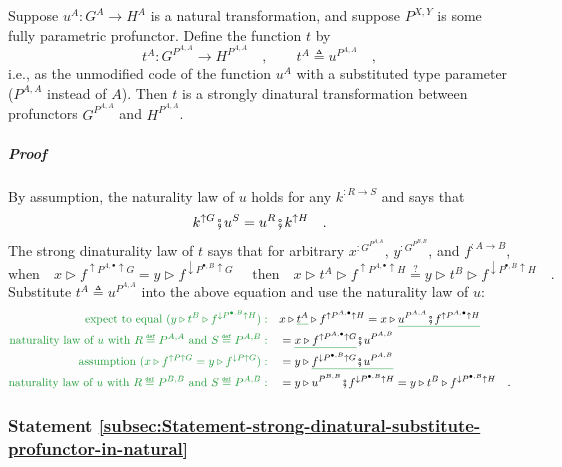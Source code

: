 Suppose $u^{A}:G^{A}\rightarrow H^{A}$ is a natural transformation,
and suppose $P^{X,Y}$ is some fully parametric profunctor. Define
the function $t$ by
\[
t^{A}:G^{P^{A,A}}\rightarrow H^{P^{A,A}}\quad,\quad\quad t^{A}\triangleq u^{P^{A,A}}\quad,
\]
i.e., as the unmodified code of the function $u^{A}$ with a substituted
type parameter ($P^{A,A}$ instead of $A$). Then $t$ is a strongly
dinatural transformation between profunctors $G^{P^{A,A}}$ and $H^{P^{A,A}}$.

\subparagraph{Proof}

By assumption, the naturality law of $u$ holds for any $k^{:R\rightarrow S}$
and says that
\[
k^{\uparrow G}\bef u^{S}=u^{R}\bef k^{\uparrow H}\quad.
\]
The strong dinaturality law of $t$ says that for arbitrary $x^{:G^{P^{A,A}}}$,
$y^{:G^{P^{B,B}}}$, and $f^{:A\rightarrow B}$,
\[
\text{when}\quad x\triangleright f^{\uparrow P^{A,\bullet}\uparrow G}=y\triangleright f^{\downarrow P^{\bullet,B}\uparrow G}\quad\text{ then}\quad x\triangleright t^{A}\triangleright f^{\uparrow P^{A,\bullet}\uparrow H}\overset{?}{=}y\triangleright t^{B}\triangleright f^{\downarrow P^{\bullet,B}\uparrow H}\quad.
\]
Substitute $t^{A}\triangleq u^{P^{A,A}}$ into the above equation
and use the naturality law of $u$:
\begin{align*}
{\color{greenunder}\text{expect to equal }(y\triangleright t^{B}\triangleright f^{\downarrow P^{\bullet,B}\uparrow H}):}\quad & x\triangleright\gunderline{t^{A}}\triangleright f^{\uparrow P^{A,\bullet}\uparrow H}=x\triangleright\gunderline{u^{P^{A,A}}\bef f^{\uparrow P^{A,\bullet}\uparrow H}}\\
{\color{greenunder}\text{naturality law of }u\text{ with }R\triangleq P^{A,A}\text{ and }S\triangleq P^{A,B}:}\quad & =\gunderline{x\triangleright f^{\uparrow P^{A,\bullet}\uparrow G}}\bef u^{P^{A,B}}\\
{\color{greenunder}\text{assumption }(x\triangleright f^{\uparrow P\uparrow G}=y\triangleright f^{\downarrow P\uparrow G}):}\quad & =y\triangleright\gunderline{f^{\downarrow P^{\bullet,B}\uparrow G}\bef u^{P^{A,B}}}\\
{\color{greenunder}\text{naturality law of }u\text{ with }R\triangleq P^{B,B}\text{ and }S\triangleq P^{A,B}:}\quad & =y\triangleright u^{P^{B,B}}\bef f^{\downarrow P^{\bullet,B}\uparrow H}=y\triangleright t^{B}\triangleright f^{\downarrow P^{\bullet,B}\uparrow H}\quad.
\end{align*}


\subsubsection{Statement \label{subsec:Statement-strong-dinatural-substitute-profunctor-in-natural}\ref{subsec:Statement-strong-dinatural-substitute-profunctor-in-natural}}

